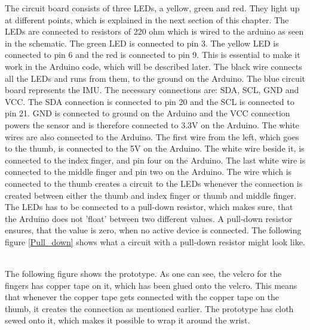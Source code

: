 The circuit board consists of three LEDs, a yellow, green and red. They light up at different points, which is explained in the next section of this chapter.
The LEDs are connected to resistors of 220 ohm which is wired to the arduino as seen in the schematic. The green LED is connected to pin 3. 
The yellow LED is connected to pin 6 and the red is connected to pin 9. This is essential to make it work in the Arduino code, which will be described later. 
The black wire connects all the LEDs and runs from them, to the ground on the Arduino. The blue circuit board represents the IMU. The necessary connections are: SDA, SCL, GND and VCC. 
The SDA connection is connected to pin 20 and the SCL is connected to pin 21. GND is connected to ground on the Arduino and the VCC connection powers the sensor and is therefore
connected to 3.3V on the Arduino. The white wires are also connected to the Arduino. The first wire from the left, which goes to the thumb, is connected to the 5V on the Arduino. 
The white wire beside it, is connected to the index finger, and pin four on the Arduino. The last white wire is connected to the middle finger and pin two on the Arduino.
The wire which is connected to the thumb creates a circuit to the LEDs whenever the connection is created between either the thumb and index finger or thumb and middle finger. \\


The LEDs has to be connected to a pull-down resistor\citep{Pull_down_res},
which makes sure, that the Arduino does not 'float' between two different values. A pull-down resistor ensures, that the value is zero, when no active device is connected.
The following figure \ref{Pull_down} shows what a circuit with a pull-down resistor might look like. \\


\begin{minipage}{\linewidth}%
\label{pull_down}
\end{minipage}\\

The following figure shows the prototype. As one can see, the velcro for the fingers has copper tape on it, which has been glued onto the velcro. 
This means that whenever the copper tape gets connected with the copper tape on the thumb, it creates the connection as mentioned earlier. 
The prototype has cloth sewed onto it, which makes it possible to wrap it around the wrist. 


